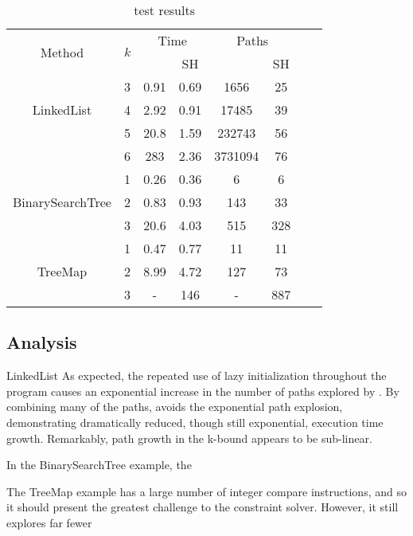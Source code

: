 \begin{table} [h]
  \centering
  \begin{tabular}{| c | c | c | c | c | c | c | c |}
  \hline
   \multirow{2}{*}{Method }&\multirow{2}{*}{ $k$ }
   &\multicolumn{2}{|c|}{Time} &\multicolumn{2}{|c|}{ Paths }\\
								&	&\gsetxt{}	&SH	&\gsetxt{} & SH\\
   \hline
    \multirow{3}{*}{LinkedList }&3	& 0.91 & 0.69  &1656 & 25		 \\
   		 				& 4	& 2.92 & 0.91	&17485  & 39 \\
   						& 5	& 20.8 & 1.59 &232743 & 56\\
						& 6	& 283 & 2.36		&3731094 & 76\\
    \hline
    \multirow{3}{*}{BinarySearchTree } & 1	&0.26	& 0.36 & 6	 & 6\\
   		 				& 2	& 0.83 & 0.93	& 143 & 33\\
   						& 3	& 20.6 & 4.03 & 515 & 328\\
    \hline
      \multirow{3}{*}{TreeMap}&1	 & 0.47 & 0.77 &11 & 11 \\
   		 				&2	& 8.99 & 4.72	& 127 & 73 \\
   						& 3	& - & 146	& - & 887 \\
						
    \hline
  \end{tabular}
  \caption{test results}
  \label{tab:results}
\end{table}

\subsection{Analysis}

LinkedList
As expected, the repeated use of lazy initialization throughout the program causes an exponential increase in the number of paths explored by \gsetxt{}. By combining many of the \gsetxt{} paths, \shtxt{} avoids the exponential path explosion, demonstrating dramatically reduced, though still exponential, execution time growth. Remarkably, path growth in the k-bound appears to be sub-linear.

In the BinarySearchTree example, the 

The TreeMap example has a large number of integer compare instructions, and so it should present the greatest challenge to the constraint solver. However, it still explores far fewer 



